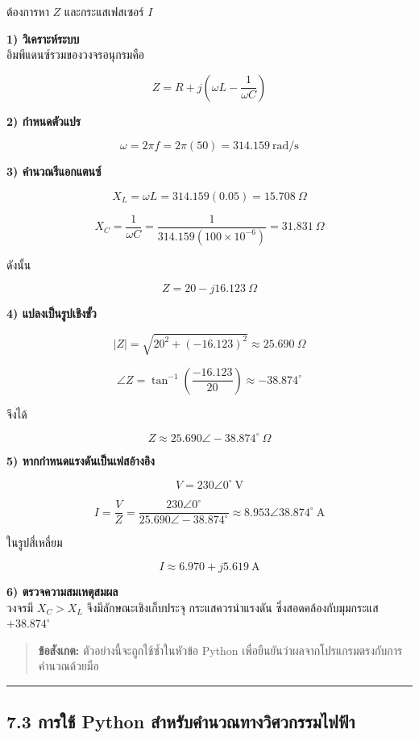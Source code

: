 ต้องการหา $Z$ และกระแสเฟสเซอร์ $I$

\textbf{1) วิเคราะห์ระบบ} \\
อิมพีแดนซ์รวมของวงจรอนุกรมคือ

\[
Z = R + j\left(\omega L-\frac{1}{\omega C}\right)
\]

\textbf{2) กำหนดตัวแปร}

\[
\omega=2\pi f=2\pi(50)=314.159\ \text{rad/s}
\]

\textbf{3) คำนวณรีแอกแตนซ์}

\[
X_L=\omega L=314.159(0.05)=15.708\ \Omega
\]

\[
X_C=\frac{1}{\omega C}=\frac{1}{314.159(100\times10^{-6})}=31.831\ \Omega
\]

ดังนั้น

\[
Z=20-j16.123\ \Omega
\]

\textbf{4) แปลงเป็นรูปเชิงขั้ว}

\[
|Z|=\sqrt{20^2+(-16.123)^2}\approx25.690\ \Omega
\]

\[
\angle Z=\tan^{-1}\left(\frac{-16.123}{20}\right)\approx-38.874^\circ
\]

จึงได้

\[
Z\approx25.690\angle -38.874^\circ\ \Omega
\]

\textbf{5) หากกำหนดแรงดันเป็นเฟสอ้างอิง}

\[
V=230\angle0^\circ\ \text{V}
\]

\[
I=\frac{V}{Z}=\frac{230\angle0^\circ}{25.690\angle-38.874^\circ}
\approx8.953\angle38.874^\circ\ \text{A}
\]

ในรูปสี่เหลี่ยม

\[
I\approx6.970+j5.619\ \text{A}
\]

\textbf{6) ตรวจความสมเหตุสมผล} \\
วงจรมี $X_C>X_L$ จึงมีลักษณะเชิงเก็บประจุ กระแสควรนำแรงดัน ซึ่งสอดคล้องกับมุมกระแส $+38.874^\circ$

\begin{quote}
\textbf{ข้อสังเกต:} ตัวอย่างนี้จะถูกใช้ซ้ำในหัวข้อ Python เพื่อยืนยันว่าผลจากโปรแกรมตรงกับการคำนวณด้วยมือ
\end{quote}

\par\noindent\rule{\textwidth}{0.4pt}\par

\subsection{7.3 การใช้ Python สำหรับคำนวณทางวิศวกรรมไฟฟ้า}

